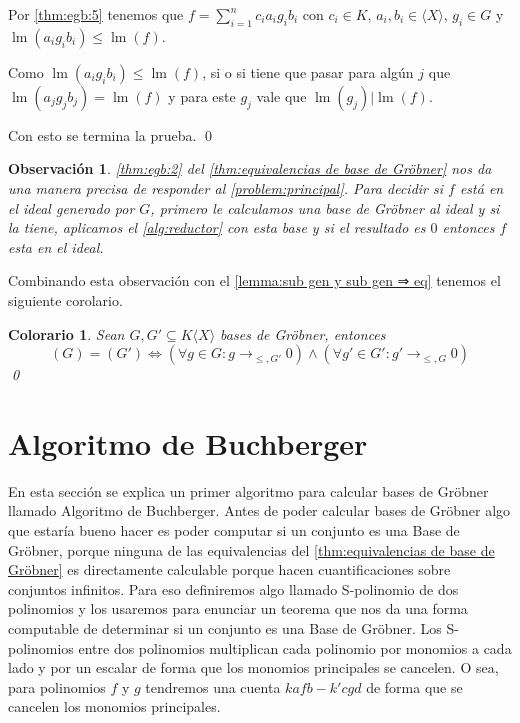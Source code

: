 \documentclass[12pt]{report}
\theoremstyle{customstyle}
\newtheorem{colorary}[theorem]{Colorario}
\newtheorem{observation}[theorem]{Observación}
\renewenvironment{proof}[1][\proofname]{{\noindent \bfseries #1: }}{\qed} %
\theoremstyle{factstyle}
\DeclareMathOperator{\lm}{lm}
\begin{document}
\begin{proof}
\begin{description}
\begin{description}
      Por \ref{thm:egb:5} tenemos que $f = ∑_{i = 1}^n c_i a_i g_i b_i$ con $c_i ∈ K$, $a_i, b_i ∈ ⟨X⟩$, $g_i ∈ G$ y $\lm(a_i g_i b_i) ≤ \lm(f)$.

      Como $\lm(a_i g_i b_i) ≤ \lm(f)$, si o si tiene que pasar para algún $j$ que $\lm(a_j g_j b_j) = \lm(f)$ y para este $g_j$ vale que $\lm(g_j) | \lm(f)$.
    \end{description}

  \end{description}
  Con esto se termina la prueba.
\end{proof}

\begin{observation}
  \ref{thm:egb:2} del \cref{thm:equivalencias de base de Gröbner} nos da una manera precisa de responder al \cref{problem:principal}. Para decidir si $f$ está en el ideal generado por $G$, primero le calculamos una base de Gröbner al ideal y si la tiene, aplicamos el \cref{alg:reductor} con esta base y si el resultado es $0$ entonces $f$ esta en el ideal.
\end{observation}

Combinando esta observación con el \cref{lemma:sub gen y sub gen ⇒ eq} tenemos el siguiente corolario.

\begin{colorary}\label{col:(G) = (G') cond}
  Sean $G, G' ⊆ K⟨X⟩$ bases de Gröbner, entonces
  \[ (G) = (G') ⇔ (∀g ∈ G : g →_{≤, G'} 0) ∧ (∀g' ∈ G' : g' →_{≤, G} 0)\]
  \qed
\end{colorary}


\section{Algoritmo de Buchberger}

En esta sección se explica un primer algoritmo para calcular bases de Gröbner llamado Algoritmo de Buchberger. Antes de poder calcular bases de Gröbner algo que estaría bueno hacer es poder computar si un conjunto es una Base de Gröbner, porque ninguna de las equivalencias del \cref{thm:equivalencias de base de Gröbner} es directamente calculable porque hacen cuantificaciones sobre conjuntos infinitos. Para eso definiremos algo llamado S-polinomio de dos polinomios y los usaremos para enunciar un teorema que nos da una forma computable de determinar si un conjunto es una Base de Gröbner. Los S-polinomios entre dos polinomios multiplican cada polinomio por monomios a cada lado y por un escalar de forma que los monomios principales se cancelen. O sea, para polinomios $f$ y $g$ tendremos una cuenta $k a f b - k' c g d$ de forma que se cancelen los monomios principales.
\end{document}
